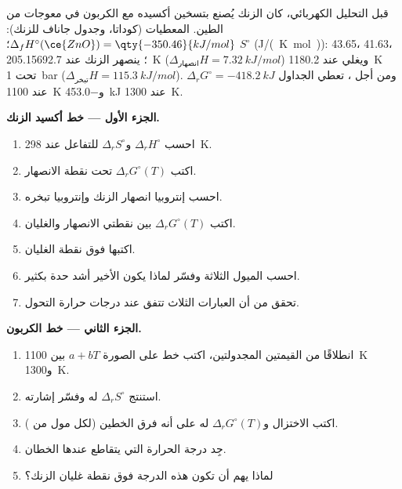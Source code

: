 \begin{problem}
\label{pb:b2:ellingham:1}
قبل التحليل الكهربائي، كان الزنك يُصنع بتسخين أكسيده مع الكربون في
معوجات من الطين. المعطيات (كوداتا، وجدول جاناف للزنك): $\Delta_f H^\circ(\ce{ZnO})
= \qty{-350.46}{kJ/mol}$؛ $S^\circ$ (\unit{J/(K.mol)}):  43.65، 
41.63،  205.15؛ ينصهر الزنك عند \qty{692.7}{K} ($\Delta_{\text{انصهار}}H =
\qty{7.32}{kJ/mol}$) ويغلي عند \qty{1180.2}{K} تحت \qty{1}{bar}
($\Delta_{\text{تبخر}}H = \qty{115.3}{kJ/mol}$). ومن أجل ، تعطي
الجداول $\Delta_r G^\circ = \qty{-418.2}{kJ}$ عند \qty{1100}{K} 
و\qty{-453.0}{kJ} عند \qty{1300}{K}.

\medskip
\noindent\textbf{الجزء الأول --- خط أكسيد الزنك.}
\begin{enumerate}
  \item احسب $\Delta_r H^\circ$ و$\Delta_r S^\circ$ للتفاعل  عند \qty{298}{K}.
  \item اكتب $\Delta_r G^\circ(T)$ تحت نقطة الانصهار.
  \item احسب إنتروبيا انصهار الزنك وإنتروبيا تبخره.
  \item اكتب $\Delta_r G^\circ(T)$ بين نقطتي الانصهار والغليان.
  \item اكتبها فوق نقطة الغليان.
  \item احسب الميول الثلاثة وفسّر لماذا يكون الأخير أشد حدة بكثير.
  \item تحقق من أن العبارات الثلاث تتفق عند درجات حرارة التحول.
\end{enumerate}

\medskip
\noindent\textbf{الجزء الثاني --- خط الكربون.}
\begin{enumerate}[resume]
  \item انطلاقًا من القيمتين المجدولتين، اكتب خط  على
        الصورة $a + bT$ بين \qty{1100}{K} و\qty{1300}{K}.
  \item استنتج $\Delta_r S^\circ$ له وفسّر إشارته.
  \item اكتب الاختزال  و$\Delta_r
        G^\circ(T)$ له على أنه فرق الخطين (لكل مول من ).
  \item جِد درجة الحرارة التي يتقاطع عندها الخطان.
  \item لماذا يهم أن تكون هذه الدرجة فوق نقطة غليان
        الزنك؟
\end{enumerate}


\end{problem}
